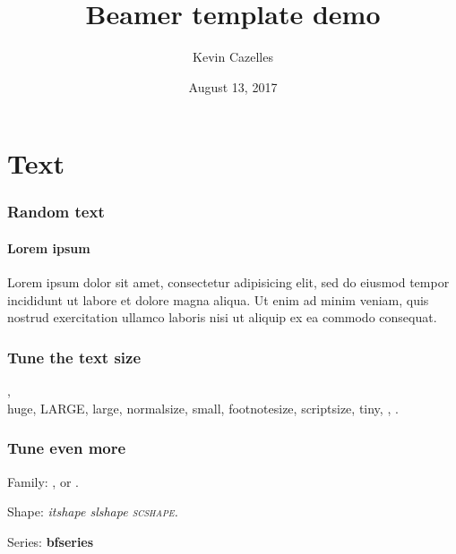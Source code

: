 \documentclass{eecslides}
\title[Beamer template]{Beamer template demo}
\date{August 13, 2017}
\author[KevCaz]{Kevin Cazelles}
\institute{Integrative Biology, University of Guelph}
\begin{document}
\begin{frame}
  \titlepage
\end{frame}






\section{Text}


\begin{frame}
    \frametitle{Random text}
    \framesubtitle{Lorem ipsum}
        Lorem ipsum dolor sit amet, consectetur adipisicing elit, sed do eiusmod
        tempor incididunt ut labore et dolore magna aliqua. Ut enim ad minim
        veniam, quis nostrud exercitation ullamco laboris nisi ut aliquip ex
        ea commodo consequat.
\end{frame}



\begin{frame}

  \frametitle{Tune the text size}

    ,\\ \huge{huge}, \LARGE{LARGE},
    \large{large}, \normalsize{normalsize}, \small{small}, \footnotesize{footnotesize}, \scriptsize{scriptsize}, \tiny{tiny}, , .


\end{frame}



\begin{frame}

  \frametitle{Tune even more}

  Family:
  ,  or .

  Shape:
   \itshape{itshape} \slshape{slshape} \scshape{scshape}.

  Series:
  \bfseries{bfseries} 

\end{frame}


\end{document}
